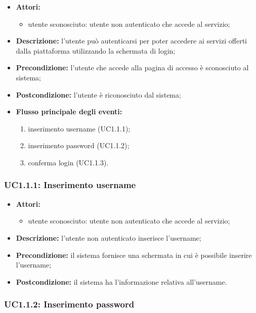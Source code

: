 \begin{itemize}
    \item \textbf{Attori:}
    \begin{itemize}
        \item utente sconosciuto: utente non autenticato che accede al servizio;
    \end{itemize}
    \item \textbf{Descrizione:} l'utente può autenticarsi per poter accedere ai servizi offerti dalla piattaforma utilizzando la schermata di login;
    \item \textbf{Precondizione:} l'utente che accede alla pagina di accesso è sconosciuto al sistema;
    \item \textbf{Postcondizione:} l'utente è riconosciuto dal sistema;
    \item \textbf{Flusso principale degli eventi:}
    \begin{enumerate}
        \item inserimento username (UC1.1.1);
        \item inserimento password (UC1.1.2);
        \item conferma login (UC1.1.3).
    \end{enumerate}
\end{itemize}

\subsubsection{UC1.1.1: Inserimento username}

\begin{itemize}
    \item \textbf{Attori:}
    \begin{itemize}
        \item utente sconosciuto: utente non autenticato che accede al servizio;
    \end{itemize}
    \item \textbf{Descrizione:} l'utente non autenticato inserisce l'username;
    \item \textbf{Precondizione:} il sistema fornisce una schermata in cui è possibile inserire l’username;
    \item \textbf{Postcondizione:} il sistema ha l'informazione relativa all'username.
\end{itemize}

\subsubsection{UC1.1.2: Inserimento password}


